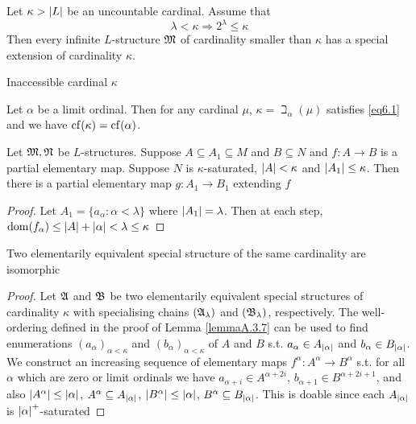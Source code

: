 \documentclass[11pt]{article}
\begin{document}
\begin{corollary}[]
Let \(\kappa>\abs{L}\) be an uncountable cardinal. Assume that
\begin{equation*}
\lambda<\kappa\Rightarrow 2^\lambda\le\kappa\label{eq6.1}
\end{equation*}
Then every infinite \(L\)-structure \(\mathfrak{M}\) of cardinality smaller than \(\kappa\) has a special extension
of cardinality \(\kappa\).
\end{corollary}

Inaccessible cardinal \(\kappa\)

Let \(\alpha\) be a limit ordinal. Then for any cardinal \(\mu\), \(\kappa=\beth_\alpha(\mu)\) satisfies \eqref{eq6.1} and we
have \(\operatorname{cf}(\kappa)=\operatorname{cf}(\alpha)\).

\begin{proposition}[]
Let \(\mathfrak{M},\mathfrak{N}\) be \(L\)-structures. Suppose \(A\subseteq A_1\subseteq M\) and \(B\subseteq N\) and \(f:A\to B\) is a partial
elementary map. Suppose \(N\) is \(\kappa\)-saturated, \(\abs{A}<\kappa\) and \(\abs{A_1}\le\kappa\). Then there is a
partial elementary map \(g:A_1\to B_1\) extending \(f\)
\end{proposition}

\begin{proof}
Let \(A_1=\{a_\alpha:\alpha<\lambda\}\) where \(\abs{A_1}=\lambda\). Then at each step, \(\dom(f_\alpha)\le\abs{A}+\abs{\alpha}<\lambda\le\kappa\)
\end{proof}


\begin{theorem}[]
\label{thm6.1.4}
Two elementarily equivalent special structure of the same cardinality are isomorphic
\end{theorem}

\begin{proof}
\label{Problem8}
Let \(\mathfrak{A}\) and \(\mathfrak{B}\) be two elementarily equivalent special structures of cardinality \(\kappa\) with
specialising chains \((\mathfrak{A}_\lambda)\) and \((\mathfrak{B}_\lambda)\), respectively. The well-ordering defined in the
proof of Lemma \ref{lemmaA.3.7} can be used to find enumerations \((a_\alpha)_{\alpha<\kappa}\)
and \((b_\alpha)_{\alpha<\kappa}\) of \(A\) and \(B\) s.t. \(a_\alpha\in A_{\abs{\alpha}}\) and \(b_\alpha\in B_{\abs{\alpha}}\).
We construct an increasing sequence of elementary maps \(f^\alpha:A^\alpha\to B^\alpha\) s.t. for all \(\alpha\) which are
zero or limit ordinals we have \(a_{\alpha+i}\in A^{\alpha+2i}\), \(b_{\alpha+1}\in B^{\alpha+2i+1}\), and
also \(\abs{A^\alpha}\le\abs{\alpha}\), \(A^\alpha\subseteq A_{\abs{\alpha}}\), \(\abs{B^\alpha}\le\abs{\alpha}\), \(B^\alpha\subseteq B_{\abs{\alpha}}\).
This is doable since each \(A_{\abs{\alpha}}\) is \(\abs{\alpha}^+\)-saturated
\end{proof}
\end{document}
